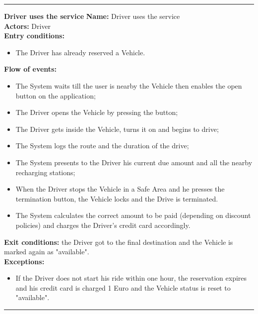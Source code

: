\begin{center}
\noindent\rule{8cm}{1.0pt}
\end{center}


\textbf{\large Driver uses the service}
\bigbreak
\textbf{Name:} Driver uses the service\\
\textbf{Actors:} Driver \\
\textbf{Entry conditions:} 
\begin{itemize}
\item The Driver has already reserved a Vehicle.
\end{itemize}
\textbf{Flow of events:} 
\begin{itemize}
\item The System waits till the user is nearby the Vehicle then enables the open button on the application;
\item The Driver opens the Vehicle by pressing the button;
\item The Driver gets inside the Vehicle, turns it on and begins to drive;
\item The System logs the route and the duration of the drive;
\item The System presents to the Driver his current due amount and all the nearby recharging stations;
\item When the Driver stops the Vehicle in a Safe Area and he presses the termination button, the Vehicle locks and the Drive is terminated.
\item The System calculates the correct amount to be paid (depending on discount policies) and charges the Driver's credit card accordingly.
\end{itemize}
\textbf{Exit conditions:} the Driver got to the final destination and the Vehicle is marked again as "available".\\
\textbf{Exceptions:}  
\begin{itemize}
\item If the Driver does not start his ride within one hour, the reservation expires and his credit card is charged 1 Euro and the Vehicle status is reset to "available". 
\end{itemize}

\begin{center}
\noindent\rule{8cm}{1.0pt}
\end{center}


